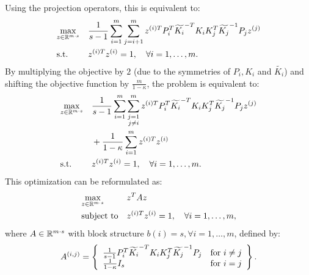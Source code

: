 %
%
%
Using the projection operators, this is equivalent to:
\begin{equation*}%
\begin{aligned}
& \underset{z \in \RR^{m\cdot s}}{\text{max}}
& & \frac{1}{s -1} \sum_{i = 1}^m \sum_{j = i+1}^m z^{(i)T} P_i^T \widetilde{K_i}^{-T} K_i K_j^T \widetilde{K_j}^{-1} P_j z^{(j)}\\%
& \text{s.t.}
& & z^{(i)T}  z^{(i)} = 1, \quad\forall i = 1,\ldots, m.
\end{aligned}
\end{equation*}
%
By multiplying the objective by $2$ (due to the symmetries of $P_i, K_i$ and $\widetilde{K_i}$) and shifting the objective function by $\frac{m}{1 - \kappa}$, the problem is equivalent to:
\begin{equation}%
\begin{aligned}
& \underset{z \in \RR^{m\cdot s}}{\text{max}}
& & \frac{1}{s -1} \sum_{i = 1}^m \sum_{\substack{j = 1\\ j\neq i}}^m z^{(i)T} P_i^T \widetilde{K_i}^{-T} K_i K_j^T \widetilde{K_j}^{-1} P_j z^{(j)}\\
&&& + \frac{1}{1-\kappa}\sum_{i = 1}^m z^{(i)T}  z^{(i)}\\
& \text{s.t.}
& & z^{(i)T}  z^{(i)} = 1, \quad\forall i = 1,\ldots, m.
\end{aligned}
\end{equation}
%
%
%
This optimization can be reformulated as:
\begin{equation}\label{eq:projZkdimapproxdualqcqp}
\begin{aligned}
& \underset{z \in \mathbb{R}^{m\cdot s}}{\text{max}}
& & z^T A z\\
& \text{subject to}
& & z^{(i)T}  z^{(i)} = 1, \quad\forall i = 1,\ldots, m,
\end{aligned}
\end{equation}
where $A \in \mathbb{R}^{m\cdot s}$ with block structure $b\left(i\right) = s, \forall i = 1,\ldots, m$, defined by:
\begin{equation*}
 A^{(i,j)} = \left\{ \begin{array}{lll}
 \frac{1}{s -1} P_i^T \widetilde{K_i}^{-T} K_i K_j^T \widetilde{K_j}^{-1} P_j  & {\rm for} ~i \neq j\\
\frac{1}{1-\kappa } I_s & {\rm for} ~i = j \end{array}\right\}.
\end{equation*}
